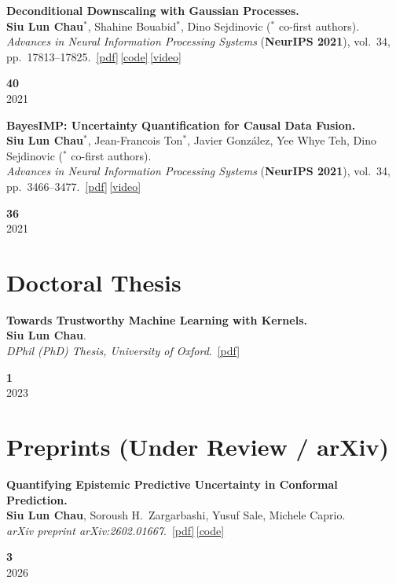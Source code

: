 \documentclass[11pt,a4paper]{article}
\newcommand{\me}{\textbf{Siu Lun Chau}}
\newcommand{\acro}[1]{\textcolor{accent}{\textbf{#1}}}
\newcommand{\venue}[2]{\textit{#1} (\acro{#2})}
\newcommand{\venueplain}[1]{\textit{#1}}
\newcommand{\pdfb}[1]{\,\href{#1}{\textcolor{accent}{\small[pdf]}}}
\newcommand{\codeb}[1]{\,\href{#1}{\textcolor{accent}{\small[code]}}}
\newcommand{\videob}[1]{\,\href{#1}{\textcolor{accent}{\small[video]}}}
\newlength{\citecolwidth}\setlength{\citecolwidth}{2.4cm}
\newlength{\indexcolwidth}\setlength{\indexcolwidth}{3.2em}
\newcommand{\citebox}[2]{%
  {\color{citecol}\textbf{\large #1}}\\[1pt]
  {\color{mutedgrey}\small #2}%
}
\newcommand{\pubentry}[4]{%
  \noindent
  \makebox[\indexcolwidth][l]{\textbf{[#1]}}%
  \begin{minipage}[t]{\dimexpr\linewidth-\indexcolwidth-\citecolwidth-0.4em\relax}#2\end{minipage}%
  \hspace{0.4em}%
  \begin{minipage}[t]{\citecolwidth}\raggedleft\citebox{#3}{#4}\end{minipage}%
  \par\vspace{6pt}}
\begin{document}
\pubentry{C18}{%
\textbf{Deconditional Downscaling with Gaussian Processes.}\\
\me$^{*}$, Shahine Bouabid$^{*}$, Dino Sejdinovic ($^{*}$ co-first authors).\\
\venue{Advances in Neural Information Processing Systems}{NeurIPS 2021}, vol.~34, pp.~17813--17825.%
\pdfb{https://proceedings.neurips.cc/paper/2021/hash/96f2b50b5d3613adf9c27049b3a839b6-Abstract.html}\codeb{https://github.com/shahineb/deconditional-downscaling}\videob{https://slideslive.com/38967430/deconditional-downscaling-with-gaussian-processes}%
}{40}{2021}

\pubentry{C19}{%
\textbf{BayesIMP: Uncertainty Quantification for Causal Data Fusion.}\\
\me$^{*}$, Jean-Francois Ton$^{*}$, Javier Gonz\'alez, Yee Whye Teh, Dino Sejdinovic ($^{*}$ co-first authors).\\
\venue{Advances in Neural Information Processing Systems}{NeurIPS 2021}, vol.~34, pp.~3466--3477.%
\pdfb{https://proceedings.neurips.cc/paper/2021/file/1ca5c750a30312d1919ae6a4d636dcc4-Paper.pdf}\videob{https://slideslive.com/38968202/bayesimp-uncertainty-quantification-for-causal-data-fusion}%
}{36}{2021}

\section{Doctoral Thesis}

\pubentry{T1}{%
\textbf{Towards Trustworthy Machine Learning with Kernels.}\\
\me.\\
\venueplain{DPhil (PhD) Thesis, University of Oxford}.%
\pdfb{https://ora.ox.ac.uk/objects/uuid:24c81031-e078-4481-a677-e7a51b659bfc}%
}{1}{2023}

\section{Preprints (Under Review / arXiv)}

\pubentry{P1}{%
\textbf{Quantifying Epistemic Predictive Uncertainty in Conformal Prediction.}\\
\me, Soroush H.\ Zargarbashi, Yusuf Sale, Michele Caprio.\\
\venueplain{arXiv preprint arXiv:2602.01667}.%
\pdfb{https://arxiv.org/pdf/2602.01667}\codeb{https://anonymous.4open.science/r/ConformalMMI-1244/README.md}%
}{3}{2026}
\end{document}
